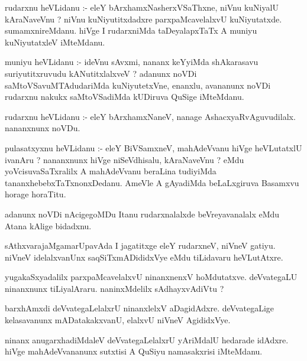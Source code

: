 \documentclass{article}
\begin{document}
\begin{mn}
rudarxnu  heVLidanu :- eleY  bArxhamxNasherxVSaThxne,  niVnu  kuNiyalU  kAraNaveVnu ?  
niVnu  kuNiyutitxdadxre  parxpaMcavelalxvU  kuNiyutatxde.  sumamxnireMdanu.  hiVge 
I  rudarxniMda  taDeyalapxTaTx  A  muniyu  kuNiyutatxleV  iMteMdanu.  
\end{mn}

\begin{mn}
muniyu  heVLidanu :- ideVnu  sAvxmi,  nananx  keYyiMda  shAkarasavu  suriyutitxruvudu  
kANutitxlalxveV ?  adanunx  noVDi  saMtoVSavuMTAdudariMda  kuNiyutetxVne,  enanxlu,  
avananunx  noVDi  rudarxnu  nakukx saMtoVSadiMda  kUDiruva  QuSige  iMteMdanu. 
\end{mn}

\begin{mn}
rudarxnu  heVLidanu :- eleY  bArxhamxNaneV,  nanage  AshacxyaRvAguvudilalx.  nananxnunx  noVDu.
\end{mn}

\begin{mn}
pulasatxyxnu  heVLidanu :-  eleY  BiVSamxneV,  mahAdeVvanu  hiVge  heVLutatxlU  ivanAru ?  
nananxnunx  hiVge  niSeVdhisalu,  kAraNaveVnu ?  eMdu  yoVcisuvaSaTxralilx  A  mahAdeVvanu  beraLina  
tudiyiMda  tananxhebebxTaTxnonxDedanu.  AmeVle  A  gAyadiMda  beLaLxgiruva  Basamxvu  horage  horaTitu.
\end{mn}

\begin{mn}
adanunx  noVDi  nAcigegoMDu  Itanu  rudarxnalalxde  beVreyavanalalx  eMdu  Atana  kAlige bidadxnu.
\end{mn}

\begin{mn}
sAthxvarajaMgamarUpavAda  I  jagatitxge  eleY  rudarxneV,  niVneV gatiyu.  
niVneV  idelalxvanUnx  saqSiTxmADididxVye  eMdu  tiLidavaru  heVLutAtxre.
\end{mn}

\begin{mn}
yugakaSxyadalilx  parxpaMcavelalxvU  ninanxnenxV  hoMdutatxve.  deVvategaLU  
ninanxnunx  tiLiyalAraru.  naninxMdelilx  sAdhayxvAdiVtu ?
\end{mn}

\begin{mn}
barxhAmxdi deVvategaLelalxrU  ninanxlelxV  aDagidAdxre.  deVvategaLige  
kelasavanunx  mADatakakxvanU,  elalxvU  niVneV  AgididxVye.
\end{mn}

\begin{mn}
ninanx  anugarxhadiMdaleV  deVvategaLelalxrU  yAriMdalU  hedarade  idAdxre.  
hiVge  mahAdeVvananunx  sutxtisi  A  QuSiyu  namasakxrisi  iMteMdanu. 
\end{mn}
\end{document}
